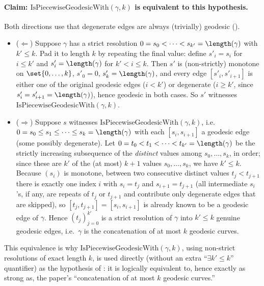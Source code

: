 \begin{definition}
  \paragraph{Claim: $\mathrm{IsPiecewiseGeodesicWith}(\gamma,k)$ is equivalent to this hypothesis.}
  Both directions use that degenerate edges are always (trivially) geodesic
  ().
  \begin{itemize}
    \item ($\Leftarrow$) Suppose $\gamma$ has a strict resolution $0=s_0<\dots<s_{k'}=\length(\gamma)$
      with $k' \le k$. Pad it to length $k$ by repeating the final value: define
      $s'_i = s_i$ for $i \le k'$ and $s'_i = \length(\gamma)$ for $k' < i \le k$. Then $s'$ is
      (non-strictly) monotone on $\set{0,\dots,k}$, $s'_0=0$, $s'_k=\length(\gamma)$, and every edge
      $[s'_i,s'_{i+1}]$ is either one of the original geodesic edges ($i<k'$) or degenerate
      ($i \ge k'$, since $s'_i=s'_{i+1}=\length(\gamma)$), hence geodesic in both cases. So $s'$
      witnesses $\mathrm{IsPiecewiseGeodesicWith}(\gamma,k)$.
    \item ($\Rightarrow$) Suppose $s$ witnesses $\mathrm{IsPiecewiseGeodesicWith}(\gamma,k)$, i.e.\
      $0=s_0\le s_1\le\dots\le s_k=\length(\gamma)$ with each $[s_i,s_{i+1}]$ a geodesic edge (some
      possibly degenerate). Let $0=t_0<t_1<\dots<t_{k'}=\length(\gamma)$ be the strictly increasing
      subsequence of the \emph{distinct} values among $s_0,\dots,s_k$, in order; since these are $k'$
      of the (at most) $k+1$ values $s_0,\dots,s_k$, we have $k' \le k$. Because $(s_i)$ is
      monotone, between two consecutive distinct values $t_j < t_{j+1}$ there is exactly one index
      $i$ with $s_i = t_j$ and $s_{i+1} = t_{j+1}$ (all intermediate $s_i$'s, if any, are repeats of
      $t_j$ or $t_{j+1}$ and contribute only degenerate edges that are skipped), so
      $[t_j,t_{j+1}] = [s_i,s_{i+1}]$ is already known to be a geodesic edge of $\gamma$. Hence
      $(t_j)_{j=0}^{k'}$ is a strict resolution of $\gamma$ into $k' \le k$ genuine geodesic edges,
      i.e.\ $\gamma$ is the concatenation of at most $k$ geodesic curves.
  \end{itemize}
  This equivalence is why $\mathrm{IsPiecewiseGeodesicWith}(\gamma,k)$, using non-strict resolutions
  of exact length $k$, is used directly (without an extra ``$\exists k'\le k$'' quantifier) as the
  hypothesis of \noderef{C1SmallBall}: it is logically equivalent to, hence exactly as strong as,
  the paper's ``concatenation of at most $k$ geodesic curves.''
\end{definition}
